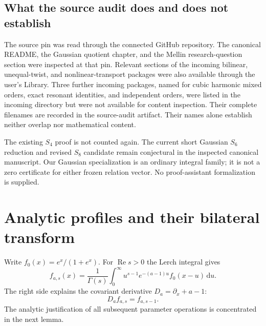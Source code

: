 \documentclass[11pt,a4paper]{article}
\numberwithin{equation}{section}
\theoremstyle{definition}\newtheorem{definition}[theorem]{Definition}
\theoremstyle{remark}\newtheorem{remark}[theorem]{Remark}
\DeclareMathOperator{\Rea}{Re}
\newcommand{\dd}{\,\mathrm d}
\begin{document}
\subsection{What the source audit does and does not establish}
The source pin was read through the connected GitHub repository. The
canonical README, the Gaussian quotient chapter, and the Mellin
research-question section were inspected at that pin. Relevant sections
of the incoming bilinear, unequal-twist, and nonlinear-transport packages
were also available through the user's Library. Three further incoming packages, named for cubic harmonic mixed orders,
exact resonant identities, and independent orders, were listed in the
incoming directory but were not available for content inspection. Their
complete filenames are recorded in the source-audit artifact.
Their names alone establish neither overlap nor mathematical content.

The existing $S_4$ proof is not counted again. The current short Gaussian
$S_6$ reduction and revised $S_8$ candidate remain conjectural in the
inspected canonical manuscript. Our Gaussian specialization is an
ordinary integral family; it is not a zero certificate for either
frozen relation vector. No proof-assistant formalization is supplied.



\section{Analytic profiles and their bilateral transform}
\label{rlc:sec:analysis}

Write $f_0(x)=e^x/(1+e^x)$. For $\Rea s>0$ the Lerch integral gives
\begin{equation}\label{rlc:eq:fractional}
 f_{a,s}(x)=\frac1{\Gamma(s)}
 \int_0^\infty u^{s-1}e^{-(a-1)u}f_0(x-u)\dd u.
\end{equation}
The right side explains the covariant derivative
$D_a=\partial_x+a-1$:
\begin{equation}\label{rlc:eq:covariant}
 D_a f_{a,s}=f_{a,s-1}.
\end{equation}
The analytic justification of all subsequent parameter operations is
concentrated in the next lemma.
\end{document}
